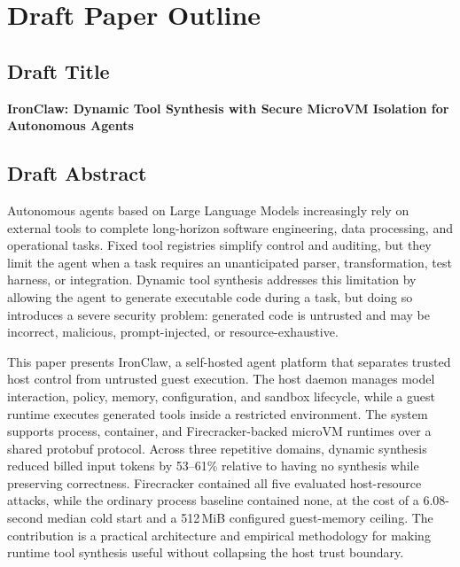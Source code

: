 
\chapter{Draft Paper Outline}
\label{AppendixB}

\section{Draft Title}
\textbf{IronClaw: Dynamic Tool Synthesis with Secure MicroVM Isolation for
Autonomous Agents}

\section{Draft Abstract}
Autonomous agents based on Large Language Models increasingly rely on external
tools to complete long-horizon software engineering, data processing, and
operational tasks. Fixed tool registries simplify control and auditing, but they
limit the agent when a task requires an unanticipated parser, transformation,
test harness, or integration. Dynamic tool synthesis addresses this limitation
by allowing the agent to generate executable code during a task, but doing so
introduces a severe security problem: generated code is untrusted and may be
incorrect, malicious, prompt-injected, or resource-exhaustive.

This paper presents IronClaw, a self-hosted agent platform that separates
trusted host control from untrusted guest execution. The host daemon manages
model interaction, policy, memory, configuration, and sandbox lifecycle, while a
guest runtime executes generated tools inside a restricted environment. The
system supports process, container, and Firecracker-backed microVM runtimes over
a shared protobuf protocol. Across three repetitive domains, dynamic synthesis
reduced billed input tokens by 53--61\% relative to having no synthesis while
preserving correctness. Firecracker contained all five evaluated host-resource
attacks, while the ordinary process baseline contained none, at the cost of a
6.08-second median cold start and a 512\,MiB configured guest-memory ceiling.
The contribution is a practical architecture and empirical methodology for
making runtime tool synthesis useful without collapsing the host trust boundary.

